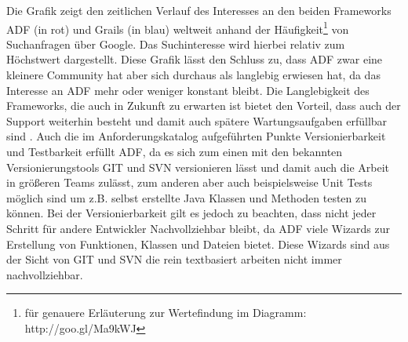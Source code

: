 Die Grafik zeigt den zeitlichen Verlauf des Interesses an den beiden Frameworks ADF (in rot) und Grails (in blau) weltweit anhand der Häufigkeit\footnote{für genauere Erläuterung zur Wertefindung im Diagramm: http://goo.gl/Ma9kWJ} von Suchanfragen über Google. Das Suchinteresse wird hierbei relativ zum Höchstwert dargestellt. Diese Grafik lässt den Schluss zu, dass ADF zwar eine kleinere Community hat aber sich durchaus als langlebig erwiesen hat, da das Interesse an ADF mehr oder weniger konstant bleibt. Die Langlebigkeit des Frameworks, die auch in Zukunft zu erwarten ist bietet den Vorteil, dass auch der Support weiterhin besteht und damit auch spätere Wartungsaufgaben erfüllbar sind \autocite[S.214]{EFCMW2013}. Auch die im Anforderungskatalog aufgeführten Punkte Versionierbarkeit und Testbarkeit erfüllt ADF, da es sich zum einen mit den bekannten Versionierungstools GIT und SVN versionieren lässt und damit auch die Arbeit in größeren Teams zulässt, zum anderen aber auch beispielsweise Unit Tests möglich sind um z.B. selbst erstellte Java Klassen und Methoden testen zu können. Bei der Versionierbarkeit gilt es jedoch zu beachten, dass nicht jeder Schritt für andere Entwickler Nachvollziehbar bleibt, da ADF viele Wizards zur Erstellung von Funktionen, Klassen und Dateien bietet. Diese Wizards sind aus der Sicht von GIT und SVN die rein textbasiert arbeiten nicht immer nachvollziehbar.

